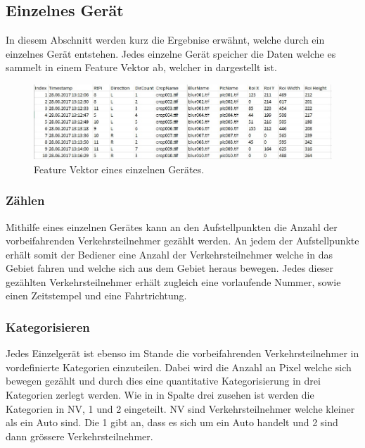 \subsection{Einzelnes Gerät}
In diesem Abschnitt werden kurz die Ergebnise erwähnt, welche durch ein einzelnes Gerät entstehen. Jedes einzelne Gerät speicher die Daten welche es sammelt in einem Feature Vektor ab, welcher in  dargestellt ist. 

\begin{figure}[H]
  \centering
  \includegraphics[width=1\textwidth]{Resultate/FeatureVector.jpg} 
  \caption{Feature Vektor eines einzelnen Gerätes.}
  \label{bFVec}
\end{figure}

\subsubsection{Zählen}
Mithilfe eines einzelnen Gerätes kann an den Aufstellpunkten die Anzahl der vorbeifahrenden Verkehrsteilnehmer gezählt werden. An jedem der Aufstellpunkte erhält somit der Bediener eine Anzahl der Verkehrsteilnehmer welche in das Gebiet fahren und welche sich aus dem Gebiet heraus bewegen. Jedes dieser gezählten Verkehrsteilnehmer erhält zugleich eine vorlaufende Nummer, sowie einen Zeitstempel und eine Fahrtrichtung.

\subsubsection{Kategorisieren}
Jedes Einzelgerät ist ebenso im Stande die vorbeifahrenden Verkehrsteilnehmer in vordefinierte Kategorien einzuteilen. Dabei wird die Anzahl an Pixel welche sich bewegen gezählt und durch dies eine quantitative Kategorisierung in drei Kategorien zerlegt werden. Wie in  in Spalte drei zusehen ist werden die Kategorien in NV, 1 und 2 eingeteilt. NV sind Verkehrsteilnehmer welche kleiner als ein Auto sind. Die 1 gibt an, dass es sich um ein Auto handelt und 2 sind dann grössere Verkehrsteilnehmer.

